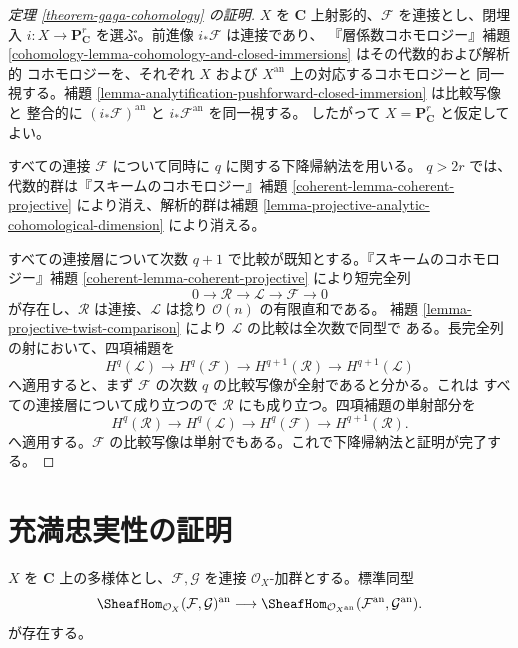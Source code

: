 \begin{proof}[定理 \ref{theorem-gaga-cohomology} の証明]
$X$ を $\mathbf C$ 上射影的、$\mathcal F$ を連接とし、閉埋入
$i:X\to\mathbf P^r_{\mathbf C}$ を選ぶ。前進像 $i_*\mathcal F$ は連接であり、
『層係数コホモロジー』補題
\ref{cohomology-lemma-cohomology-and-closed-immersions} はその代数的および解析的
コホモロジーを、それぞれ $X$ および $X^{\mathrm{an}}$ 上の対応するコホモロジーと
同一視する。補題 \ref{lemma-analytification-pushforward-closed-immersion} は比較写像と
整合的に $(i_*\mathcal F)^{\mathrm{an}}$ と $i_*\mathcal F^{\mathrm{an}}$ を同一視する。
したがって $X=\mathbf P^r_{\mathbf C}$ と仮定してよい。

すべての連接 $\mathcal F$ について同時に $q$ に関する下降帰納法を用いる。
$q>2r$ では、代数的群は『スキームのコホモロジー』補題
\ref{coherent-lemma-coherent-projective} により消え、解析的群は補題
\ref{lemma-projective-analytic-cohomological-dimension} により消える。

すべての連接層について次数 $q+1$ で比較が既知とする。『スキームのコホモロジー』補題
\ref{coherent-lemma-coherent-projective} により短完全列
$$
0\longrightarrow\mathcal R\longrightarrow
\mathcal L\longrightarrow\mathcal F\longrightarrow0
$$
が存在し、$\mathcal R$ は連接、$\mathcal L$ は捻り $\mathcal O(n)$ の有限直和である。
補題 \ref{lemma-projective-twist-comparison} により $\mathcal L$ の比較は全次数で同型で
ある。長完全列の射において、四項補題を
$$
H^q(\mathcal L)\longrightarrow H^q(\mathcal F)
\longrightarrow H^{q+1}(\mathcal R)\longrightarrow H^{q+1}(\mathcal L)
$$
へ適用すると、まず $\mathcal F$ の次数 $q$ の比較写像が全射であると分かる。これは
すべての連接層について成り立つので $\mathcal R$ にも成り立つ。四項補題の単射部分を
$$
H^q(\mathcal R)\longrightarrow H^q(\mathcal L)
\longrightarrow H^q(\mathcal F)\longrightarrow H^{q+1}(\mathcal R).
$$
へ適用する。$\mathcal F$ の比較写像は単射でもある。これで下降帰納法と証明が完了する。
\end{proof}

\section{充満忠実性の証明}
\label{section-proof-gaga-fully-faithful}

\begin{lemma}
\label{lemma-analytification-internal-hom}
$X$ を $\mathbf C$ 上の多様体とし、$\mathcal F,\mathcal G$ を連接
$\mathcal O_X$-加群とする。標準同型
$$
\SheafHom_{\mathcal O_X}(\mathcal F,\mathcal G)^{\mathrm{an}}
\longrightarrow
\SheafHom_{\mathcal O_{X^{\mathrm{an}}}}
(\mathcal F^{\mathrm{an}},\mathcal G^{\mathrm{an}}).
$$
が存在する。
\end{lemma}


